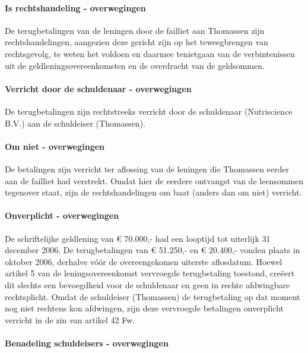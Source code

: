 \documentclass[
  dutch,
  a4paper,
]{article}
\begin{document}
\paragraph{Is rechtshandeling - overwegingen}\label{is-rechtshandeling---overwegingen-77}

De terugbetalingen van de leningen door de failliet aan Thomassen zijn rechtshandelingen, aangezien deze gericht zijn op het teweegbrengen van rechtsgevolg, te weten het voldoen en daarmee tenietgaan van de verbintenissen uit de geldleningsovereenkomsten en de overdracht van de geldsommen.

\paragraph{Verricht door de schuldenaar - overwegingen}\label{verricht-door-de-schuldenaar---overwegingen-77}

De terugbetalingen zijn rechtstreeks verricht door de schuldenaar (Nutriscience B.V.) aan de schuldeiser (Thomassen).

\paragraph{Om niet - overwegingen}\label{om-niet---overwegingen-77}

De betalingen zijn verricht ter aflossing van de leningen die Thomassen eerder aan de failliet had verstrekt. Omdat hier de eerdere ontvangst van de leensommen tegenover staat, zijn de rechtshandelingen om baat (anders dan om niet) verricht.

\paragraph{Onverplicht - overwegingen}\label{onverplicht---overwegingen-77}

De schriftelijke geldlening van € 70.000,- had een looptijd tot uiterlijk 31 december 2006. De terugbetalingen van € 51.250,- en € 20.400,- vonden plaats in oktober 2006, derhalve vóór de overeengekomen uiterste aflosdatum. Hoewel artikel 5 van de leningsovereenkomst vervroegde terugbetaling toestond, creëert dit slechts een bevoegdheid voor de schuldenaar en geen in rechte afdwingbare rechtsplicht. Omdat de schuldeiser (Thomassen) de terugbetaling op dat moment nog niet rechtens kon afdwingen, zijn deze vervroegde betalingen onverplicht verricht in de zin van artikel 42 Fw.

\paragraph{Benadeling schuldeisers - overwegingen}\label{benadeling-schuldeisers---overwegingen-77}
\end{document}
